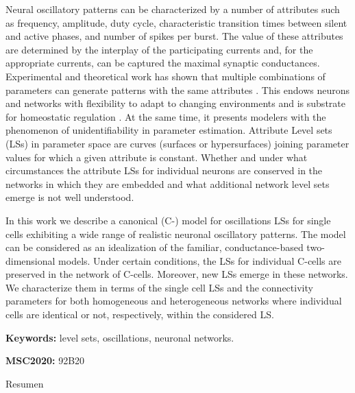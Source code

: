 %
\label{sec:abstract}

Neural oscillatory patterns can be characterized by a number of attributes such as frequency, amplitude, duty cycle, characteristic transition times between silent and active phases, and number of spikes per burst. The value of these attributes are determined by the interplay of the participating currents and, for the appropriate currents, can be captured the maximal synaptic conductances. Experimental and theoretical work has shown that multiple combinations of parameters can generate patterns with the same attributes \cite{Prinz,Rot,Oly,Olypher2010}. This endows neurons and networks with flexibility to adapt to changing environments and is substrate for homeostatic regulation \cite{Olypher2010}. At the same time, it presents modelers with the phenomenon of unidentifiability in parameter estimation. Attribute Level sets (LSs) in parameter space are curves (surfaces or hypersurfaces) joining parameter values for which a given attribute is constant. Whether and under what circumstances the attribute LSs for individual neurons are conserved in the networks in which they are embedded and what additional network level sets emerge is not well understood.

In this work we describe a canonical (C-) model for oscillations LSs for single cells exhibiting a wide range of realistic neuronal oscillatory patterns. The model can be considered as an idealization of the familiar, conductance-based two-dimensional models. Under certain conditions, the LSs for individual C-cells are preserved in the network of C-cells. Moreover, new LSs emerge in these networks. We characterize them in terms of the single cell LSs and the connectivity parameters for both homogeneous and heterogeneous networks where individual cells are identical or not, respectively, within the considered LS.

\textbf{Keywords:} level sets, oscillations, neuronal networks.

\textbf{MSC2020:} 92B20


\newpage
\vspace*{5mm}
{Resumen}
\label{sec:abstract-diff}
\vspace*{12mm}

